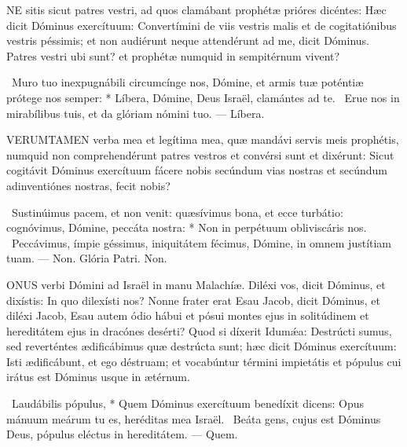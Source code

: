 
\lettrine[lines=2]{N}{E} sitis sicut patres vestri, ad quos clamábant prophétæ prióres dicéntes: Hæc dicit Dóminus exercítuum: Convertímini de viis vestris malis et de cogitatiónibus vestris péssimis; et non audiérunt neque attendérunt ad me, dicit Dóminus. Patres vestri ubi sunt? et prophétæ numquid in sempitérnum vivent?

\R\ Muro tuo inexpugnábili circumcínge nos, Dómine, et armis tuæ poténtiæ prótege nos semper: * Líbera, Dómine, Deus Israël, clamántes ad te. \V\ Erue nos in mirabílibus tuis, et da glóriam nómini tuo. — Líbera.



\lettrine[lines=2]{V}{ERUMTAMEN} verba mea et legítima mea, quæ mandávi servis meis prophétis, numquid non comprehendérunt patres vestros et convérsi sunt et dixérunt: Sicut cogitávit Dóminus exercítuum fácere nobis secúndum vias nostras et secúndum adinventiónes nostras, fecit nobis?

\R\ Sustinúimus pacem, et non venit: quæsívimus bona, et ecce turbátio: cognóvimus, Dómine, peccáta nostra: * Non in perpétuum obliviscáris nos. \V\ Peccávimus, ímpie géssimus, iniquitátem fécimus, Dómine, in omnem justítiam tuam. — Non. Glória Patri. Non.




\lettrine[lines=2]{O}{NUS} verbi Dómini ad Israël in manu Malachíæ. Diléxi vos, dicit Dóminus, et dixístis: In quo dilexísti nos? Nonne frater erat Esau Jacob, dicit Dóminus, et diléxi Jacob, Esau autem ódio hábui et pósui montes ejus in solitúdinem et hereditátem ejus in dracónes desérti? Quod si díxerit Idumǽa: Destrúcti sumus, sed reverténtes ædificábimus quæ destrúcta sunt; hæc dicit Dóminus exercítuum: Isti ædificábunt, et ego déstruam; et vocabúntur términi impietátis et pópulus cui irátus est Dóminus usque in ætérnum.

\R\ Laudábilis pópulus, * Quem Dóminus exercítuum benedíxit dicens: Opus mánuum meárum tu es, heréditas mea Israël. \V\ Beáta gens, cujus est Dóminus Deus, pópulus eléctus in hereditátem. — Quem.


